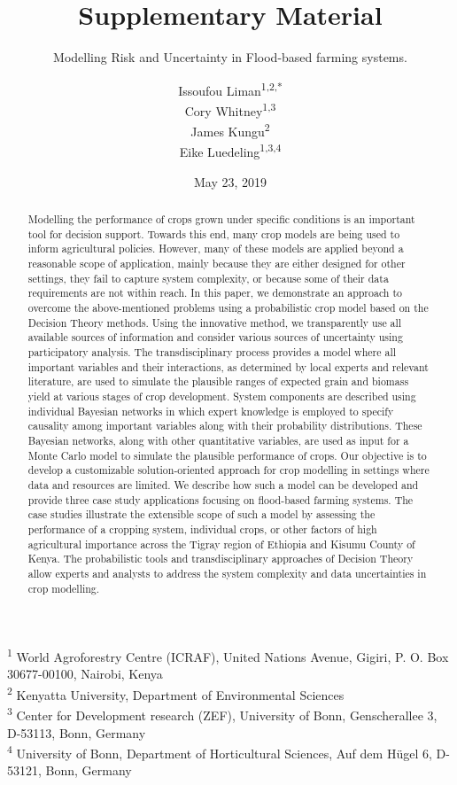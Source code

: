 \documentclass[12pt,oneside]{article}
\title{Supplementary Material}
\subtitle{Modelling Risk and Uncertainty in Flood-based farming systems.}
\author{Issoufou Liman\textsuperscript{1,2,*} \\ Cory Whitney\textsuperscript{1,3} \\ James Kungu\textsuperscript{2} \\ Eike Luedeling\textsuperscript{1,3,4}}
\date{May 23, 2019}
\begin{document}
\maketitle
\begin{abstract}
Modelling the performance of crops grown under specific conditions is an important tool for decision support. Towards this end, many crop models are being used to inform agricultural policies. However, many of these models are applied beyond a reasonable scope of application, mainly because they are either designed for other settings, they fail to capture system complexity, or because some of their data requirements are not within reach. In this paper, we demonstrate an approach to overcome the above-mentioned problems using a probabilistic crop model based on the Decision Theory methods. Using the innovative method, we transparently use all available sources of information and consider various sources of uncertainty using participatory analysis. The transdisciplinary process provides a model where all important variables and their interactions, as determined by local experts and relevant literature, are used to simulate the plausible ranges of expected grain and biomass yield at various stages of crop development. System components are described using individual Bayesian networks in which expert knowledge is employed to specify causality among important variables along with their probability distributions. These Bayesian networks, along with other quantitative variables, are used as input for a Monte Carlo model to simulate the plausible performance of crops. Our objective is to develop a customizable solution-oriented approach for crop modelling in settings where data and resources are limited. We describe how such a model can be developed and provide three case study applications focusing on flood-based farming systems. The case studies illustrate the extensible scope of such a model by assessing the performance of a cropping system, individual crops, or other factors of high agricultural importance across the Tigray region of Ethiopia and Kisumu County of Kenya. The probabilistic tools and transdisciplinary approaches of Decision Theory allow experts and analysts to address the system complexity and data uncertainties in crop modelling.
\end{abstract}

{
\hypersetup{linkcolor=black}
\setcounter{tocdepth}{5}
\tableofcontents
}
\textsuperscript{1} World Agroforestry Centre (ICRAF), United Nations Avenue, Gigiri, P. O. Box 30677-00100, Nairobi, Kenya\\
\textsuperscript{2} Kenyatta University, Department of Environmental Sciences\\
\textsuperscript{3} Center for Development research (ZEF), University of Bonn, Genscherallee 3, D-53113, Bonn, Germany\\
\textsuperscript{4} University of Bonn, Department of Horticultural Sciences, Auf dem Hügel 6, D-53121, Bonn, Germany
\end{document}

